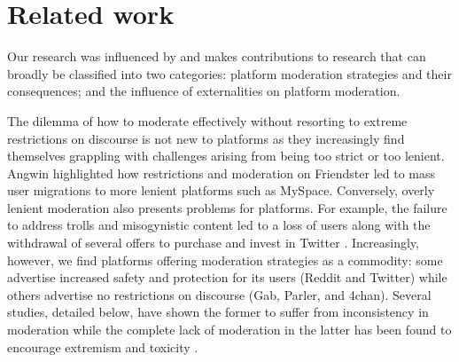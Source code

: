 \section{Related work} \label{sec:related}
Our research was influenced by and makes contributions to research that can
broadly be classified into two categories: platform moderation strategies and
their consequences; and the influence of externalities on platform moderation.

The dilemma of how to moderate effectively without resorting to extreme
restrictions on discourse is not new to platforms as they increasingly find
themselves grappling with challenges arising from being too strict or too
lenient. Angwin \cite{stealing-myspace} highlighted how restrictions and
moderation on Friendster led to mass user migrations to more lenient platforms
such as MySpace. Conversely, overly lenient moderation also presents problems
for platforms. For example, the failure to address trolls and misogynistic
content led to a loss of users along with the withdrawal of several offers to
purchase and invest in Twitter \cite{disney-salesforce}. Increasingly, however,
we find platforms offering moderation strategies as a commodity: some advertise
increased safety and protection for its users (\eg Reddit and Twitter) while
others advertise no restrictions on discourse (\eg Gab, Parler, and 4chan).
Several studies, detailed below, have shown the former to suffer from
inconsistency in moderation while the complete lack of moderation in the latter
has been found to encourage extremism and toxicity \cite{zannettou2018gab,
hine2017kek}.

